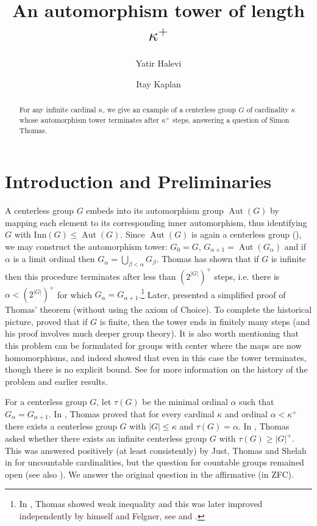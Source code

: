 \documentclass[11pt]{amsart}
\title{An automorphism tower of length $\kappa^+$}
\author{Yatir Halevi}
\author{Itay Kaplan}
\date{}
\theoremstyle{plain}
\theoremstyle{definition}
\newcounter{step}
\DeclareMathOperator{\aut}{Aut}
\begin{document}
\begin{abstract}
For any infinite cardinal $\kappa$, we give an example of a centerless group $G$ of cardinality $\kappa$ whose automorphism tower terminates after $\kappa^+$ steps, answering a question of Simon Thomas. 
\end{abstract}

\maketitle

\section{Introduction and Preliminaries}

A centerless group $G$ embeds into its automorphism group $\aut(G)$ by mapping each element to its corresponding inner automorphism, thus identifying $G$ with $\mathrm{Inn}(G)\leq \aut(G)$. Since $\aut(G)$ is again a centerless group (\cite[Lemma 1.1.1]{ThomasBook}), we may construct the  automorphism tower: $G_0=G$, $G_{\alpha+1}=\aut(G_\alpha)$ and if $\alpha$ is a limit ordinal then $G_\alpha=\bigcup_{\beta<\alpha} G_\beta$. Thomas \cite{Thomas,thomasII} has shown that if $G$ is infinite then this procedure terminates after less than $(2^{|G|})^+$ steps, i.e. there is $\alpha< (2^{|G|})^+$ for which $G_\alpha=G_{\alpha+1}$.\footnote{In \cite{Thomas}, Thomas showed weak inequality and this was later improved independently by himself and Felgner, see \cite{thomasII} and \cite[Corollary 3.3.2]{ThomasBook}.} Later, \cite{KaplanShelah882} presented a simplified proof of Thomas' theorem (without using the axiom of Choice). To complete the historical picture, \cite{Wielandt} proved that if $G$ is finite, then the tower ends in finitely many steps (and his proof involves much deeper group theory). It is also worth mentioning that this problem can be formulated for groups with center where the maps are now homomorphisms, and indeed \cite{Hamkins} showed that even in this case the tower terminates, though there is no explicit bound. 
See \cite{ThomasBook} for more information on the history of the problem and earlier results.

For a centerless group $G$, let $\tau(G)$ be the minimal ordinal $\alpha$ such that $G_\alpha=G_{\alpha +1}$. In \cite{Thomas}, Thomas proved that for every cardinal $\kappa$ and ordinal $\alpha< \kappa^+$ there exists a centerless group $G$ with $|G|\leq \kappa$ and $\tau(G)=\alpha$.  In \cite[Question 1.9]{thomasII}, Thomas asked whether there exists an infinite centerless group $G$ with $\tau(G)\geq |G|^+$. This was answered positively (at least consistently) by Just, Thomas and Shelah in \cite{JuShTh} for uncountable cardinalities, but the question for countable groups remained open (see also \cite[Question 3.1.16]{ThomasBook}). We answer the original question in the affirmative (in ZFC). 
\end{document}
